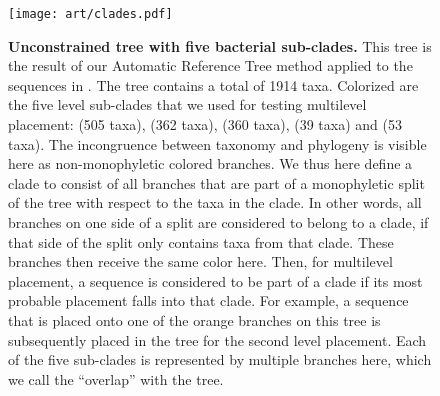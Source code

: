 \begin{figure}[hpbt]
    \centering
    \texttt{[image: art/clades.pdf]}
    \caption[Unconstrained  tree with five bacterial sub-clades]{
        \textbf{Unconstrained  tree with five bacterial sub-clades.}
        This tree is the result of our Automatic Reference Tree method
        applied to the  sequences in .
        The tree contains a total of 1914 taxa.
        Colorized are the five  level sub-clades that we used for testing multilevel placement:
         (505 taxa),  (362 taxa),  (360 taxa),
         (39 taxa) and  (53 taxa).
        The incongruence between taxonomy and phylogeny is visible here as non-monophyletic colored branches.
        We thus here define a clade to consist of all branches
        that are part of a monophyletic split of the tree with respect to the taxa in the clade.
        In other words, all branches on one side of a split are considered to belong to a clade, %
        if that side of the split only contains taxa from that clade.
        These branches then receive the same color here.
        Then, for multilevel placement, a sequence is considered to be part of a clade
        if its most probable placement falls into that clade.
        For example, a sequence that is placed onto one of the orange branches on this tree
        is subsequently placed in the  tree for the second level placement.
        Each of the five sub-clades is represented by multiple branches here,
        which we call the ``overlap'' with the  tree.
    }
    \label{fig:clades}
\end{figure}



